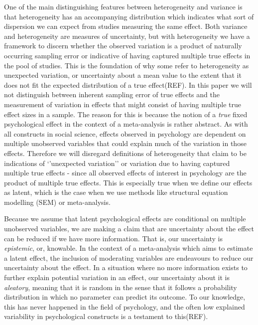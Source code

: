 \documentclass[
  letterpaper,
  DIV=11,
  numbers=noendperiod]{scrartcl}
\begin{document}
One of the main distinguishing features between heterogeneity and
variance is that heterogeneity has an accompanying distribution which
indicates what sort of dispersion we can expect from studies measuring
the same effect. Both variance and heterogeneity are measures of
uncertainty, but with heterogeneity we have a framework to discern
whether the observed variation is a product of naturally occurring
sampling error or indicative of having captured multiple true effects in
the pool of studies. This is the foundation of why some refer to
heterogeneity as unexpected variation, or uncertainty about a mean value
to the extent that it does not fit the expected distribution of a true
effect(REF). In this paper we will not distinguish between inherent
sampling error of true effects and the measurement of variation in
effects that might consist of having multiple true effect sizes in a
sample. The reason for this is because the notion of a \emph{true} fixed
psychological effect in the context of a meta-analysis is rather
abstract. As with all constructs in social science, effects observed in
psychology are dependent on multiple unobserved variables that could
explain much of the variation in those effects. Therefore we will
disregard definitions of heterogeneity that claim to be indications of
`'unexpected variation'' or variation due to having captured multiple
true effects - since all observed effects of interest in psychology are
the product of multiple true effects. This is especially true when we
define our effects as latent, which is the case when we use methods like
structural equation modelling (SEM) or meta-analysis.

Because we assume that latent psychological effects are conditional on
multiple unobserved variables, we are making a claim that are
uncertainty about the effect can be reduced if we have more information.
That is, our uncertainty is \emph{epistemic}, or, knowable. In the
context of a meta-analysis which aims to estimate a latent effect, the
inclusion of moderating variables are endeavours to reduce our
uncertainty about the effect. In a situation where no more information
exists to further explain potential variation in an effect, our
uncertainty about it is \emph{aleatory}, meaning that it is random in
the sense that it follows a probability distribution in which no
parameter can predict its outcome. To our knowledge, this has never
happened in the field of psychology, and the often low explained
variability in psychological constructs is a testament to this(REF).
\end{document}
